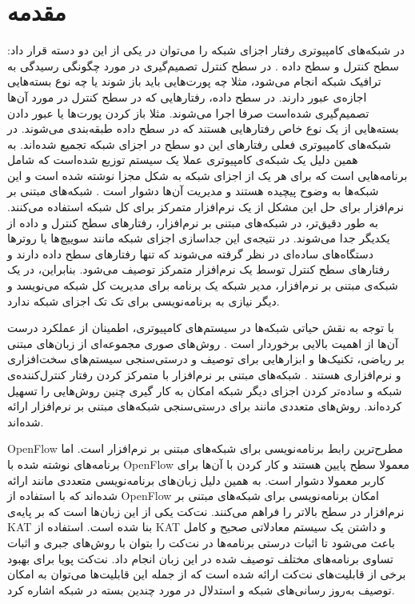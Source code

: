 \chapter{مقدمه}
در شبکه‌های کامپیوتری رفتار اجزای شبکه‌ را می‌توان در یکی از این دو دسته قرار داد:
سطح کنترل
 و سطح داده
.
در سطح کنترل تصمیم‌گیری در مورد چگونگی رسیدگی به ترافیک شبکه انجام می‌شود، مثلا چه پورت‌هایی باید باز شوند یا چه نوع بسته‌هایی اجازه‌ی عبور دارند.
در سطح داده، رفتار‌هایی که در سطح کنترل در مورد آن‌ها تصمیم‌گیری شده‌است صرفا اجرا می‌شوند. 
مثلا باز کردن پورت‌ها یا عبور دادن بسته‌هایی از یک نوع خاص 
رفتار‌هایی هستند که در سطح داده طبقه‌‌بندی می‌شوند.
در شبکه‌های کامپیوتری فعلی رفتار‌های این دو سطح در اجزای شبکه تجمیع شده‌اند.
به همین دلیل یک شبکه‌ی کامپیوتری عملا یک سیستم توزیع شده‌است که شامل برنامه‌هایی است که برای هر یک از اجزای شبکه به شکل مجزا نوشته شده است و این شبکه‌ها به وضوح پیچیده هستند و مدیریت آن‌ها دشوار است
\cite{sdn-survey}.
شبکه‌های مبتنی بر نرم‌افزار
برای حل این مشکل از یک نرم‌افزار متمرکز برای کل‌ شبکه استفاده می‌کنند.
به طور دقیق‌تر، در شبکه‌های مبتنی بر نرم‌افزار، رفتار‌های سطح کنترل و داده از یکدیگر جدا می‌شوند. 
در نتیجه‌ی این جداسازی اجزای شبکه مانند سوییچ‌ها یا روترها دستگاه‌های ساده‌ای در نظر گرفته می‌شوند که تنها رفتار‌های سطح داده دارند و رفتار‌های سطح کنترل توسط یک نرم‌افزار متمرکز توصیف می‌شود.
بنابراین، در یک شبکه‌ی مبتنی بر نرم‌افزار، مدیر شبکه یک برنامه برای مدیریت کل شبکه می‌نویسد و دیگر نیازی به برنامه‌نویسی برای تک تک اجزای شبکه ندارد.

با توجه به نقش حیاتی شبکه‌ها در سیستم‌های کامپیوتری، اطمینان از عملکرد درست آن‌ها از اهمیت بالایی برخوردار است 
\cite{foerster2018survey}.
روش‌های صوری
مجموعه‌ای از زبان‌های مبتنی بر ریاضی، تکنیک‌ها و ابزار‌هایی برای توصیف و درستی‌سنجی سیستم‌های سخت‌افزاری و نرم‌افزاری هستند
\cite{clarke1996formal}.
شبکه‌های مبتنی بر نرم‌افزار با متمرکز کردن رفتار کنترل‌کننده‌ی شبکه و ساده‌تر کردن اجزای دیگر شبکه امکان به کار گیری چنین روش‌هایی را تسهیل کرده‌اند.
روش‌های متعددی مانند
\cite{al2010flowchecker,khurshid2013veriflow,not-nice,zeng2014libra}
برای درستی‌سنجی شبکه‌های مبتنی بر نرم‌افزار ارائه شده‌اند.

OpenFlow
\cite{mckeown2008openflow}
مطرح‌ترین رابط برنامه‌نویسی
برای شبکه‌های مبتنی بر نرم‌افزار است.
اما برنامه‌های نوشته شده با 
OpenFlow
معمولا سطح پایین هستند و کار کردن با آن‌ها برای کاربر معمولا دشوار است. 
به همین دلیل زبان‌های برنامه‌نویسی متعددی مانند
\cite{foster2011frenetic,voellmy2011nettle,netcore,procera,pyretic,netkat}
ارائه شده‌اند
که با استفاده از 
OpenFlow
امکان برنامه‌نویسی برای شبکه‌های مبتنی بر نرم‌افزار در سطح بالاتر را فراهم می‌کنند.
نت‌کت یکی از این زبان‌ها است
 \cite{netkat} که بر پایه‌ی
KAT \cite{kat}
بنا شده است.
استفاده از 
KAT
و داشتن یک سیستم معادلاتی صحیح
و کامل
باعث می‌شود تا اثبات درستی برنامه‌ها در نت‌کت را بتوان با روش‌های جبری و اثبات تساوی برنامه‌های مختلف توصیف شده در این زبان انجام داد.
نت‌کت پویا
\cite{dynetkat}
برای بهبود برخی از قابلیت‌های نت‌کت ارائه شده است که از جمله این قابلیت‌ها می‌توان به امکان توصیف به‌روز رسانی‌های شبکه و استدلال در مورد چندین بسته در شبکه اشاره کرد.

